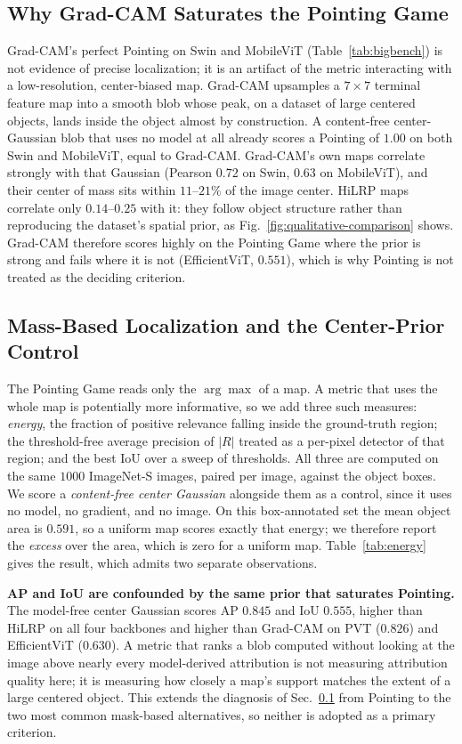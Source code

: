 \documentclass[lettersize,journal]{IEEEtran}
\theoremstyle{definition}
\theoremstyle{plain}
\begin{document}
\subsection{Why Grad-CAM Saturates the Pointing Game}
\label{sec:gradcam-blob}
Grad-CAM's perfect Pointing on Swin and MobileViT (Table~\ref{tab:bigbench}) is not evidence of precise localization; it is an artifact of the metric interacting with a low-resolution, center-biased map. Grad-CAM upsamples a $7{\times}7$ terminal feature map into a smooth blob whose peak, on a dataset of large centered objects, lands inside the object almost by construction. A content-free center-Gaussian blob that uses no model at all already scores a Pointing of $1.00$ on both Swin and MobileViT, equal to Grad-CAM. Grad-CAM's own maps correlate strongly with that Gaussian (Pearson $0.72$ on Swin, $0.63$ on MobileViT), and their center of mass sits within $11$--$21\%$ of the image center. HiLRP maps correlate only $0.14$--$0.25$ with it: they follow object structure rather than reproducing the dataset's spatial prior, as Fig.~\ref{fig:qualitative-comparison} shows. Grad-CAM therefore scores highly on the Pointing Game where the prior is strong and fails where it is not (EfficientViT, $0.551$), which is why Pointing is not treated as the deciding criterion.

\subsection{Mass-Based Localization and the Center-Prior Control}
\label{sec:energy-localization}
The Pointing Game reads only the $\arg\max$ of a map. A metric that uses the whole map is potentially more informative, so we add three such measures: \emph{energy}, the fraction of positive relevance falling inside the ground-truth region; the threshold-free average precision of $|R|$ treated as a per-pixel detector of that region; and the best IoU over a sweep of thresholds. All three are computed on the same $1000$ ImageNet-S images, paired per image, against the object boxes. We score a \emph{content-free center Gaussian} alongside them as a control, since it uses no model, no gradient, and no image. On this box-annotated set the mean object area is $0.591$, so a uniform map scores exactly that energy; we therefore report the \emph{excess} over the area, which is zero for a uniform map. Table~\ref{tab:energy} gives the result, which admits two separate observations.

\textbf{AP and IoU are confounded by the same prior that saturates Pointing.} The model-free center Gaussian scores AP $0.845$ and IoU $0.555$, higher than HiLRP on all four backbones and higher than Grad-CAM on PVT ($0.826$) and EfficientViT ($0.630$). A metric that ranks a blob computed without looking at the image above nearly every model-derived attribution is not measuring attribution quality here; it is measuring how closely a map's support matches the extent of a large centered object. This extends the diagnosis of Sec.~\ref{sec:gradcam-blob} from Pointing to the two most common mask-based alternatives, so neither is adopted as a primary criterion.
\end{document}
